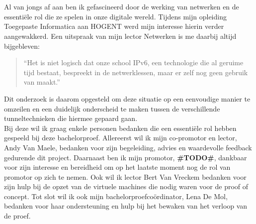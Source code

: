 
\chapter*{}%
\label{ch:voorwoord}


Al van jongs af aan ben ik gefascineerd door de werking van netwerken en de essentiële rol die ze spelen in onze digitale wereld.  
Tijdens mijn opleiding Toegepaste Informatica aan HOGENT werd mijn interesse hierin verder aangewakkerd.  
Een uitspraak van mijn lector Netwerken is me daarbij altijd bijgebleven:  

\begin{quote}
    ``Het is niet logisch dat onze school IPv6, een technologie die al geruime tijd bestaat, bespreekt in de netwerklessen, maar er zelf nog geen gebruik van maakt.''
\end{quote}

Dit onderzoek is daarom opgesteld om deze situatie op een eenvoudige manier te omzeilen en een duidelijk onderscheid te maken tussen de verschillende tunneltechnieken die hiermee gepaard gaan.\\

Bij deze wil ik graag enkele personen bedanken die een essentiële rol hebben gespeeld bij deze bachelorproef.  
Allereerst wil ik mijn co-promotor en lector, Andy Van Maele, bedanken voor zijn begeleiding, advies en waardevolle feedback gedurende dit project.  
Daarnaast ben ik mijn promotor, \textbf{\#TODO\#}, dankbaar voor zijn interesse en bereidheid om op het laatste moment nog de rol van promotor op zich te nemen.
Ook wil ik lector Bert Van Vreckem bedanken voor zijn hulp bij de opzet van de virtuele machines die nodig waren voor de proof of concept.
Tot slot wil ik ook mijn bachelorproefcoördinator, Lena De Mol, bedanken voor haar ondersteuning en hulp bij het bewaken van het verloop van de proef.  
